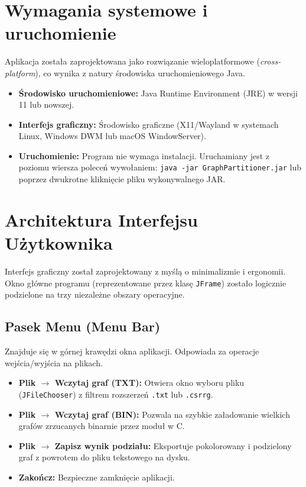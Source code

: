 \documentclass[12pt,a4paper]{article}
\begin{document}
\section{Wymagania systemowe i uruchomienie}
Aplikacja została zaprojektowana jako rozwiązanie wieloplatformowe (\textit{cross-platform}), co wynika z natury środowiska uruchomieniowego Java.
\begin{itemize}
    \item \textbf{Środowisko uruchomieniowe:} Java Runtime Environment (JRE) w wersji 11 lub nowszej.
    \item \textbf{Interfejs graficzny:} Środowisko graficzne (X11/Wayland w systemach Linux, Windows DWM lub macOS WindowServer).
    \item \textbf{Uruchomienie:} Program nie wymaga instalacji. Uruchamiany jest z poziomu wiersza poleceń wywołaniem: \texttt{java -jar GraphPartitioner.jar} lub poprzez dwukrotne kliknięcie pliku wykonywalnego JAR.
\end{itemize}

\newpage
\section{Architektura Interfejsu Użytkownika}
Interfejs graficzny został zaprojektowany z myślą o minimalizmie i ergonomii. Okno główne programu (reprezentowane przez klasę \texttt{JFrame}) zostało logicznie podzielone na trzy niezależne obszary operacyjne.

\subsection{Pasek Menu (Menu Bar)}
Znajduje się w górnej krawędzi okna aplikacji. Odpowiada za operacje wejścia/wyjścia na plikach.
\begin{itemize}
    \item \textbf{Plik $\rightarrow$ Wczytaj graf (TXT):} Otwiera okno wyboru pliku (\texttt{JFileChooser}) z filtrem rozszerzeń \texttt{.txt} lub \texttt{.csrrg}.
    \item \textbf{Plik $\rightarrow$ Wczytaj graf (BIN):} Pozwala na szybkie załadowanie wielkich grafów zrzucanych binarnie przez moduł w C.
    \item \textbf{Plik $\rightarrow$ Zapisz wynik podziału:} Eksportuje pokolorowany i podzielony graf z powrotem do pliku tekstowego na dysku.
    \item \textbf{Zakończ:} Bezpieczne zamknięcie aplikacji.
\end{itemize}
\end{document}
